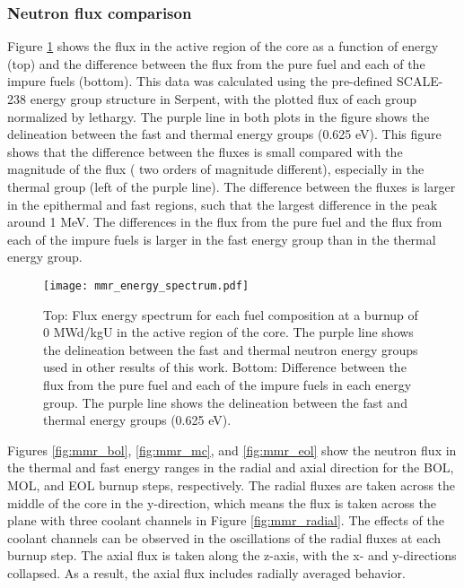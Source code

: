 \subsubsection{Neutron flux comparison}
Figure \ref{fig:mmr_energy_spectrum} shows the flux in the active 
region of the core as a function of energy (top) and the difference between 
the flux from the pure fuel and each of the impure fuels (bottom). This 
data was 
calculated using the pre-defined SCALE-238 energy group structure in Serpent,
with the plotted flux of each group normalized by lethargy. The purple 
line in both plots in the figure shows the delineation between the fast and 
thermal energy groups (0.625 eV). This figure shows that the difference between 
the fluxes is small compared with the magnitude of the flux ( two orders 
of magnitude different), especially in 
the thermal group (left of the purple line). The difference between the 
fluxes is larger in the epithermal and fast regions, such that the largest 
difference in the peak around 1 MeV. The differences 
in the flux from the pure fuel and the flux from each of the impure 
fuels is larger in the fast energy group than in the thermal energy group.

\begin{figure}
        \centering
        \texttt{[image: mmr\_energy\_spectrum.pdf]}
        \caption{Top: Flux energy spectrum for each fuel composition at a 
        burnup of 0 MWd/kgU in the active region of the core. The 
        purple line shows the delineation between the fast and thermal 
        neutron energy groups used in other results of this work.
        Bottom: Difference between the flux from the pure fuel and each 
        of the impure fuels in each energy group. The purple line shows the 
        delineation between the fast and thermal energy groups (0.625 eV). }
        \label{fig:mmr_energy_spectrum}
\end{figure}

Figures \ref{fig:mmr_bol}, \ref{fig:mmr_mc}, and \ref{fig:mmr_eol} show 
the neutron flux in the thermal and fast energy ranges in the radial and axial 
direction for the \gls{BOL}, \gls{MOL}, and \gls{EOL} burnup steps, 
respectively. The radial fluxes are taken 
across the middle of the core in the y-direction, which means the flux 
is taken across the plane with three coolant channels in Figure 
\ref{fig:mmr_radial}. The effects of the coolant channels can be observed 
in the oscillations of the radial fluxes at each burnup step. The axial 
flux is taken along the z-axis, with the 
x- and y-directions collapsed. As a result, the axial flux includes 
radially averaged behavior. 

